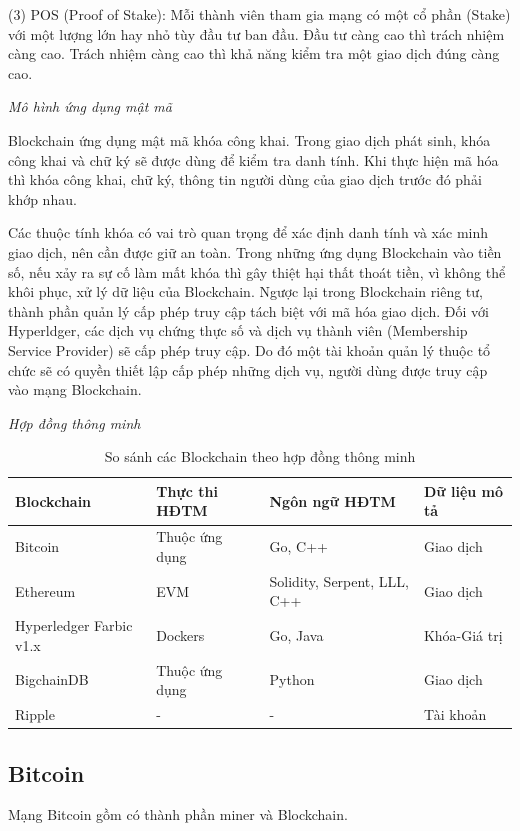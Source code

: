 (3) POS (Proof of Stake): Mỗi thành viên tham gia mạng có một cổ phần (Stake) với một lượng lớn hay nhỏ tùy đầu tư ban đầu. Đầu tư càng cao thì trách nhiệm càng cao. Trách nhiệm càng cao thì khả năng kiểm tra một giao dịch đúng càng cao. 

\emph{Mô hình ứng dụng mật mã}

Blockchain ứng dụng mật mã khóa công khai. Trong giao dịch phát sinh, khóa công khai và chữ ký sẽ được dùng để kiểm tra danh tính.
Khi thực hiện mã hóa thì khóa công khai, chữ ký, thông tin người dùng của giao dịch trước đó phải khớp nhau.

Các thuộc tính khóa có vai trò quan trọng để xác định danh tính và xác minh giao dịch, nên cần được giữ an toàn. Trong những ứng dụng Blockchain vào tiền số, nếu xảy ra sự cố làm mất khóa thì gây thiệt hại thất thoát tiền, vì không thể khôi phục, xử lý dữ liệu của Blockchain.
Ngược lại trong Blockchain riêng tư, thành phần quản lý cấp phép truy cập tách biệt với mã hóa giao dịch. Đối với Hyperldger, các dịch vụ chứng thực số và dịch vụ thành viên (Membership Service Provider) sẽ cấp phép truy cập. Do đó một tài khoản quản lý thuộc tổ chức sẽ có quyền thiết lập cấp phép những dịch vụ, người dùng được truy cập vào mạng Blockchain. 

\emph{Hợp đồng thông minh}



\begin{table}
\caption{So sánh các Blockchain theo hợp đồng thông minh}
	\label{table:ssblochchain}
	\begin{tabularx} {\textwidth} {|X|X|X|p{5cm}|}
\hline
	Blockchain & Thực thi HĐTM & Ngôn ngữ HĐTM  & Dữ liệu mô tả \\ \hline
	Bitcoin  & Thuộc ứng dụng & Go, C++ & Giao dịch\\ \hline
	Ethereum  & EVM & Solidity, Serpent, LLL, C++ & Giao dịch\\ \hline
	Hyperledger Farbic v1.x  & Dockers & Go, Java & Khóa-Giá trị\\ \hline
	BigchainDB   & Thuộc ứng dụng  &  Python & Giao dịch\\ \hline
	Ripple   & -  & - & Tài khoản \\ \hline
\end{tabularx}
\end{table}

\subsection{Bitcoin}
Mạng Bitcoin gồm có thành phần miner và Blockchain.

